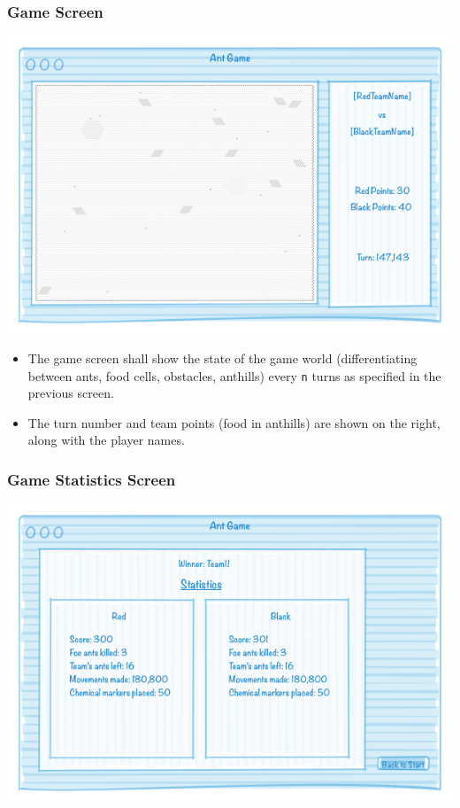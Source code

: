 \documentclass[11pt]{article}
\begin{document}
\subsubsection{Game Screen}

\begin{center}
\includegraphics[width=\textwidth]{low-level-diagrams/interface/game-screen}
\end{center}

\begin{itemize}
\item The game screen shall show the state of the game world (differentiating between ants, food cells, obstacles, anthills) every \texttt{n} turns as specified in the previous screen.
\item The turn number and team points (food in anthills) are shown on the right, along with the player names.
\end{itemize}

\subsubsection{Game Statistics Screen}

\begin{center}
\includegraphics[width=\textwidth]{low-level-diagrams/interface/game-statistics-screen}
\end{center}
\end{document}
